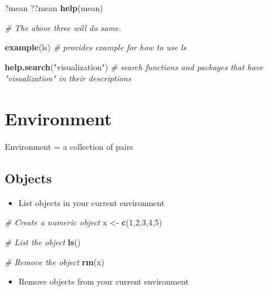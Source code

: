 \documentclass[
]{book}
\newenvironment{Shaded}{\begin{snugshade}}{\end{snugshade}}
\newcommand{\CommentTok}[1]{\textcolor[rgb]{0.56,0.35,0.01}{\textit{#1}}}
\newcommand{\DecValTok}[1]{\textcolor[rgb]{0.00,0.00,0.81}{#1}}
\newcommand{\KeywordTok}[1]{\textcolor[rgb]{0.13,0.29,0.53}{\textbf{#1}}}
\newcommand{\NormalTok}[1]{#1}
\newcommand{\StringTok}[1]{\textcolor[rgb]{0.31,0.60,0.02}{#1}}
\providecommand{\tightlist}{%
  \setlength{\itemsep}{0pt}\setlength{\parskip}{0pt}}
\begin{document}
\begin{Shaded}
\begin{Highlighting}[]
\NormalTok{?mean}
\NormalTok{??mean}
\KeywordTok{help}\NormalTok{(mean)}

\CommentTok{\# The above three will do same. }

\KeywordTok{example}\NormalTok{(ls) }\CommentTok{\# provides example for how to use ls }

\KeywordTok{help.search}\NormalTok{(}\StringTok{"visualization"}\NormalTok{) }\CommentTok{\# search functions and packages that have "visualization" in their descriptions}
\end{Highlighting}
\end{Shaded}

\hypertarget{environment}{%
\section{Environment}\label{environment}}

Environment = a collection of pairs

\hypertarget{objects}{%
\subsection{Objects}\label{objects}}

\begin{itemize}
\tightlist
\item
  List objects in your current environment
\end{itemize}

\begin{Shaded}
\begin{Highlighting}[]
\CommentTok{\# Create a numeric object }
\NormalTok{x \textless{}{-}}\StringTok{ }\KeywordTok{c}\NormalTok{(}\DecValTok{1}\NormalTok{,}\DecValTok{2}\NormalTok{,}\DecValTok{3}\NormalTok{,}\DecValTok{4}\NormalTok{,}\DecValTok{5}\NormalTok{)}

\CommentTok{\# List the object }
\KeywordTok{ls}\NormalTok{()}

\CommentTok{\# Remove the object }
\KeywordTok{rm}\NormalTok{(x)}
\end{Highlighting}
\end{Shaded}

\begin{itemize}
\tightlist
\item
  Remove objects from your current environment
\end{itemize}
\end{document}
